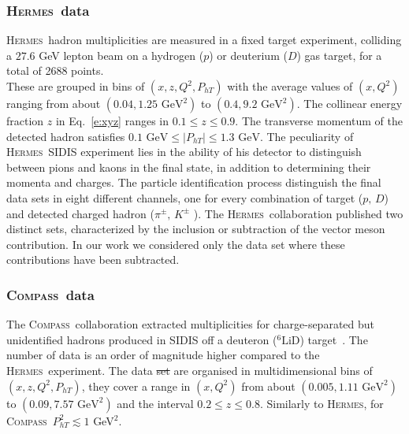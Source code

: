 \documentclass[aps,preprintnumbers,showpacs,nofootinbib,superscriptaddress,floatfix]{revtex4}
\newcommand{\AS}[1]{{\textcolor[rgb]{1,0,1}{#1}}}
\newcommand{\hermes}{\textsc{Hermes}}
\newcommand{\compass}{\textsc{Compass}}
\newcommand{\Tperp}{T}
\begin{document}
\subsubsection{\hermes\ data}
\label{sss:hermes}

\hermes\ hadron multiplicities are measured in a fixed target experiment, colliding a $27.6$ GeV lepton beam on a hydrogen ($p$) or deuterium ($D$) gas target, for a total of 2688 points.\\
These are grouped in bins of $(x,z,Q^2,P_{hT})$ with the average values of $(x,Q^2)$ ranging from about $(0.04, 1.25\text{ GeV}^2)$ to $(0.4, 9.2\text{ GeV}^2)$. 
The collinear energy fraction $z$ in Eq.~\eqref{e:xyz} ranges in $0.1\leq z\leq 0.9$. The transverse momentum of the detected hadron satisfies $0.1 \text{ GeV} \leq \vert P_{hT} \vert \leq 1.3 \text{ GeV}$.
The peculiarity of \hermes\ SIDIS experiment lies in the ability of his detector to distinguish between pions and kaons in the final state, in addition to \AS{determining} their momenta and charges.
The particle identification process distinguish the final data sets in eight different channels, one for every combination of target ($p,\,D$) and detected charged hadron ($\pi^\pm, \,  K^\pm$ ).
\AS{The \hermes\ collaboration} published two distinct sets, characterized by the inclusion or subtraction of the vector meson contribution. In our work we considered only the data set where these contributions have been subtracted. \\


\subsubsection{\compass\ data}
\label{sss:compass}

\AS{The \compass\ }collaboration extracted multiplicities \AS{for} charge-separated but unidentified hadrons produced in SIDIS off a deuteron ($^6\text{LiD}$) target~\cite{Adolph:2013stb}.  The number of data is an order of magnitude higher compared to the \hermes\ experiment. The data \AS{\sout{set}} are organised in multidimensional bins of $(x,z,Q^2,P_{h\Tperp})$, they cover a range in $(x,Q^2)$ from about $(0.005, 1.11\text{ GeV}^2)$ to $(0.09, 7.57\text{ GeV}^2)$ and the interval $0.2 \leq z \leq 0.8$. Similarly to \hermes , for \compass\ $P_{h\Tperp}^2 \lesssim 1$ GeV$^2$. 
\end{document}
